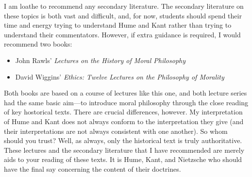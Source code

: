 I am loathe to recommend any secondary literature. The secondary literature on these topics is both vast and difficult, and, for now, students should spend their time and energy trying to understand Hume and Kant rather than trying to understand their commentators. However, if extra guidance is required, I would recommend two books:
\begin{itemize}
    \item John Rawls' \emph{Lectures on the History of Moral Philosophy}
    \item David Wiggins' \emph{Ethics: Twelve Lectures on the Philosophy of Morality}
\end{itemize}
Both books are based on a course of lectures like this one, and both lecture series had the same basic aim---to introduce moral philosophy through the close reading of key hostorical texts. There are crucial differences, however. My interpretation of Hume and Kant does not always conform to the interpretation they give (and their interpretations are not always consistent with one another). So whom should you trust? Well, as always, only the historical text is truly authoritative. These lectures and the secondary literature that I have recommended are merely aids to your reading of these texts. It is Hume, Kant, and Nietzsche who should have the final say concerning the content of their doctrines. \change

% 


